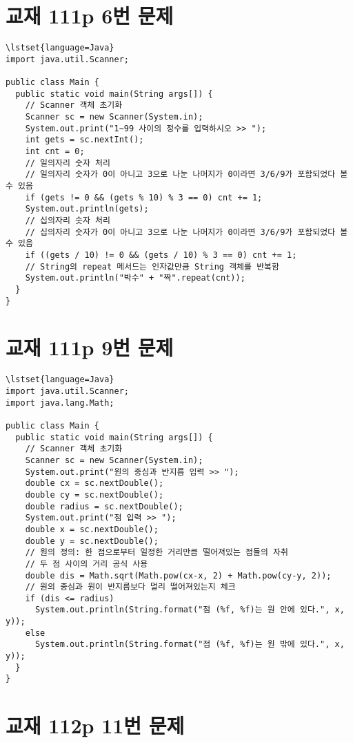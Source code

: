 \documentclass{article}
\begin{document}
\section{교재 111p 6번 문제}
\begin{lstlisting}
\lstset{language=Java}
import java.util.Scanner;

public class Main {
  public static void main(String args[]) {
    // Scanner 객체 초기화
    Scanner sc = new Scanner(System.in);
    System.out.print("1~99 사이의 정수를 입력하시오 >> ");
    int gets = sc.nextInt();
    int cnt = 0;
    // 일의자리 숫자 처리
    // 일의자리 숫자가 0이 아니고 3으로 나눈 나머지가 0이라면 3/6/9가 포함되었다 볼 수 있음
    if (gets != 0 && (gets % 10) % 3 == 0) cnt += 1;
    System.out.println(gets);
    // 십의자리 숫자 처리
    // 십의자리 숫자가 0이 아니고 3으로 나눈 나머지가 0이라면 3/6/9가 포함되었다 볼 수 있음
    if ((gets / 10) != 0 && (gets / 10) % 3 == 0) cnt += 1;
    // String의 repeat 메서드는 인자값만큼 String 객체를 반복함
    System.out.println("박수" + "짝".repeat(cnt));
  }
}
\end{lstlisting}
\section{교재 111p 9번 문제}
\begin{lstlisting}
\lstset{language=Java}
import java.util.Scanner;
import java.lang.Math;

public class Main {
  public static void main(String args[]) {
    // Scanner 객체 초기화
    Scanner sc = new Scanner(System.in);
    System.out.print("원의 중심과 반지름 입력 >> ");
    double cx = sc.nextDouble();
    double cy = sc.nextDouble();
    double radius = sc.nextDouble();
    System.out.print("점 입력 >> ");
    double x = sc.nextDouble();
    double y = sc.nextDouble();
    // 원의 정의: 한 점으로부터 일정한 거리만큼 떨어져있는 점들의 자취
    // 두 점 사이의 거리 공식 사용
    double dis = Math.sqrt(Math.pow(cx-x, 2) + Math.pow(cy-y, 2));
    // 원의 중심과 원이 반지름보다 멀리 떨어져있는지 체크
    if (dis <= radius)
      System.out.println(String.format("점 (%f, %f)는 원 안에 있다.", x, y));
    else
      System.out.println(String.format("점 (%f, %f)는 원 밖에 있다.", x, y));
  }
}
\end{lstlisting}
\section{교재 112p 11번 문제}
\end{document}
